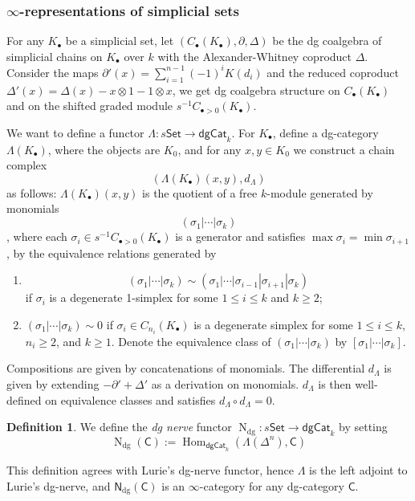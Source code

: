 \documentclass[12pt]{amsart}
\theoremstyle{definition}
\newtheorem{defn}[thm]{Definition}
\theoremstyle{remark}
\numberwithin{equation}{section}
\newcommand{\del}{\partial}
\renewcommand{\del}{\partial}
\newcommand{\CC}{{\mathsf C}}
\newcommand{\1}{{\mathbb{1}}}
\newcommand{\set}{\mathsf{Set}}
\newcommand{\dgcat}{\mathsf{dgCat}}
\newcommand{\n}{\operatorname{N}}
\newcommand{\nerv}{\mathsf{N}}
\newcommand{\dg}{{\operatorname{dg}}}
\newcommand{\Hom}{\operatorname{Hom}}
\begin{document}
\subsubsection{$\infty$-representations of simplicial sets}
For any $K_{\bullet}$ be a simplicial set, let $(C_{\bullet}(K_{\bullet}), \del, \Delta)$ be the dg coalgebra of simplicial chains on $K_{\bullet}$ over $k$ with the Alexander-Whitney coproduct $\Delta$. Consider the maps $\del'(x) = \sum_{i = 1}^{n - 1} (-1)^{i} K(d_i)$ and the reduced coproduct $\Delta'(x) = \Delta(x) - x\otimes 1 - 1 \otimes x$, we get dg coalgebra structure on $C_{\bullet}(K_{\bullet})$ and on the shifted graded module $s^{-1}C_{\bullet > 0}(K_{\bullet})$. 

We want to define a functor $\Lambda: s\set \to \dgcat_k$. For $K_{\bullet}$, define a dg-category $\Lambda(K_{\bullet})$, where the objects are $K_0$, and for any $x, y \in K_0$ we construct a chain complex $$
(\Lambda(K_{\bullet})(x, y), d_{\Lambda})$$ as follows: $\Lambda(K_{\bullet})(x, y)$ is the quotient of a free $k$-module generated by monomials 
$$(\sigma_1|\cdots|\sigma_k)$$
, where each 
$
\sigma_i \in s^{-1}C_{\bullet > 0}(K_{\bullet})
$ is a generator and satisfies $\max \sigma_i = \min \sigma_{i+ 1}$, by the equivalence relations generated by 
\begin{enumerate}
    \item $$(\sigma_1|\cdots|\sigma_k) \sim (\sigma_1|\cdots|\sigma_{i - 1}|\sigma_{i+1}|\sigma_k)$$
    if $\sigma_i$ is a degenerate 1-simplex for some $1\le i \le k$ and $k \ge 2$;
    \item $(\sigma_1|\cdots|\sigma_k) \sim 0$ if $\sigma_i \in C_{n_i}(K_{\bullet})$ is a degenerate simplex for some $1\le i \le k$, $n_i \ge 2$, and $k \ge 1$. Denote the equivalence class of $(\sigma_1|\cdots|\sigma_k)$ by $[\sigma_1|\cdots|\sigma_k]$.
\end{enumerate} Compositions are given by concatenations of monomials. The differential $d_{\Lambda}$ is given by extending $-\del' + \Delta'$ as a derivation on monomials. $d_{\Lambda}$ is then well-defined on equivalence classes and satisfies $d_{\Lambda}\circ d_{\Lambda} = 0$.


\begin{defn}
    We define the {\it dg nerve} functor $\n_{\dg}: s\set \to \dgcat_k$ by setting
    $$
        \n_{\dg}(\CC) := \Hom_{\dgcat_k}(\Lambda(\Delta^n), \CC)
    $$
\end{defn}
This definition agrees with Lurie's dg-nerve functor, hence $\Lambda$ is the left adjoint to  Lurie's dg-nerve, and $\nerv_{\dg}(\CC)$ is an $\infty$-category for any dg-category $\CC$. 
\end{document}
